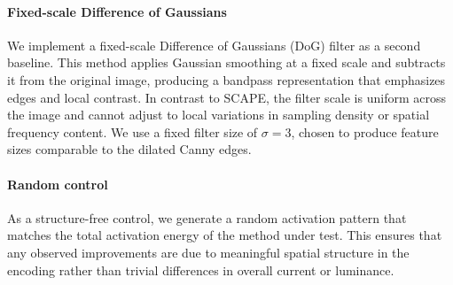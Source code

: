 \paragraph{Fixed-scale Difference of Gaussians}
We implement a fixed-scale Difference of Gaussians (DoG) filter as a second baseline. This method applies Gaussian smoothing at a fixed scale and subtracts it from the original image, producing a bandpass representation that emphasizes edges and local contrast. In contrast to SCAPE, the filter scale is uniform across the image and cannot adjust to local variations in sampling density or spatial frequency content. We use a fixed filter size of $\sigma = 3$, chosen to produce feature sizes comparable to the dilated Canny edges.

\paragraph{Random control}
As a structure-free control, we generate a random activation pattern that matches the total activation energy of the method under test. This ensures that any observed improvements are due to meaningful spatial structure in the encoding rather than trivial differences in overall current or luminance.

